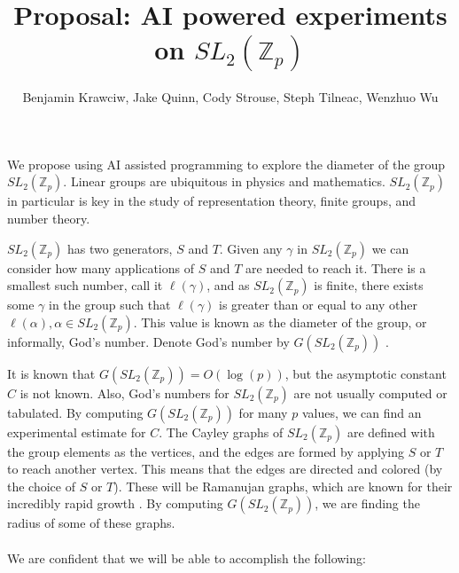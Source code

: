 \documentclass{article}
\begin{document}
\newcommand{\Real}{\mathbb{R}}
\newcommand{\Complex}{\mathbb{C}}
\newcommand{\Int}{\mathbb{Z}}
\newcommand{\slzp}{SL_2(\Int_p)}
\newcommand{\Gs}{G(\slzp)}

\title{Proposal: AI powered experiments on $SL_2(\Int_p)$}
\author{Benjamin Krawciw, Jake Quinn, Cody Strouse, Steph Tilneac, Wenzhuo Wu}
\maketitle

We propose using AI assisted programming to explore the diameter of the group $\slzp$. Linear groups are ubiquitous in physics and mathematics. $\slzp$ in particular is key in the study of representation theory, finite groups, and number theory. 

$\slzp$ has two generators, $S$ and $T$. Given any $\gamma$ in $\slzp$ we can consider how many applications of $S$ and $T$ are needed to reach it. There is a smallest such number, call it $\ell(\gamma)$, and as $\slzp$ is finite, there exists some $\gamma$ in the group such that $\ell(\gamma)$ is greater than or equal to any other $\ell(\alpha), \alpha \in \slzp$. This value is known as the diameter of the group, or informally, God's number. Denote God's number by $G(\slzp)$ \cite{helfgott2008growthgenerationsl2zpz}. 

It is known that $\Gs = O(\log(p))$, but the asymptotic constant $C$ is not known. Also, God's numbers for $\slzp$ are not usually computed or tabulated. By computing $\Gs$ for many $p$ values, we can find an experimental estimate for $C$. The Cayley graphs of $\slzp$ are defined with the group elements as the vertices, and the edges are formed by applying $S$ or $T$ to reach another vertex. This means that the edges are directed and colored (by the choice of $S$ or $T$). These will be Ramanujan graphs, which are known for their incredibly rapid growth \cite{lubotzkyphillipssarnak}. By computing $\Gs$, we are finding the radius of some of these graphs.\\
 \\
\noindent We are confident that we will be able to accomplish the following:
\end{document}
